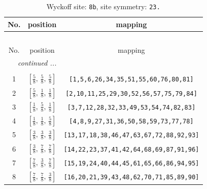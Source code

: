 \documentclass[fleqn,8pt]{jsarticle}
\begin{document}
\begin{longtable}{ccc}
\caption{Wyckoff site: {\tt 8b}, site symmetry: {\tt 23.}}
 \\
 \hline \hline
No. & position & mapping \\ \hline \endfirsthead

\multicolumn{2}{l}{\tablename\ \thetable{}} \\
 \hline \hline
No. & position & mapping \\ \hline \endhead

 \hline \hline
\multicolumn{2}{r}{\footnotesize\it continued ...} \\ \endfoot

 \hline \hline
\multicolumn{2}{r}{} \\ \endlastfoot

1 & $\left[ \frac{5}{8},\, \frac{5}{8},\, \frac{5}{8} \right]$ & {\tt [1,5,6,26,34,35,51,55,60,76,80,81]} \\ \hline
2 & $\left[ \frac{5}{8},\, \frac{1}{8},\, \frac{1}{8} \right]$ & {\tt [2,10,11,25,29,30,52,56,57,75,79,84]} \\ \hline
3 & $\left[ \frac{1}{8},\, \frac{5}{8},\, \frac{1}{8} \right]$ & {\tt [3,7,12,28,32,33,49,53,54,74,82,83]} \\ \hline
4 & $\left[ \frac{1}{8},\, \frac{1}{8},\, \frac{5}{8} \right]$ & {\tt [4,8,9,27,31,36,50,58,59,73,77,78]} \\ \hline
5 & $\left[ \frac{3}{8},\, \frac{3}{8},\, \frac{3}{8} \right]$ & {\tt [13,17,18,38,46,47,63,67,72,88,92,93]} \\ \hline
6 & $\left[ \frac{3}{8},\, \frac{7}{8},\, \frac{7}{8} \right]$ & {\tt [14,22,23,37,41,42,64,68,69,87,91,96]} \\ \hline
7 & $\left[ \frac{7}{8},\, \frac{3}{8},\, \frac{7}{8} \right]$ & {\tt [15,19,24,40,44,45,61,65,66,86,94,95]} \\ \hline
8 & $\left[ \frac{7}{8},\, \frac{7}{8},\, \frac{3}{8} \right]$ & {\tt [16,20,21,39,43,48,62,70,71,85,89,90]} \\
\end{longtable}
\renewcommand{\arraystretch}{1.2}
\end{document}
